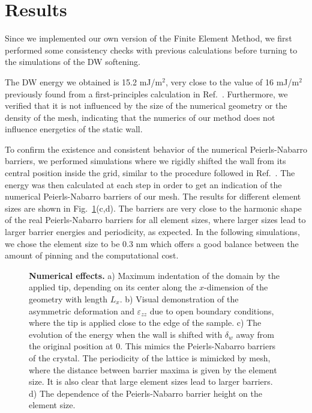 \section{Results}
Since we implemented our own version of the Finite Element Method, we first performed some consistency checks with previous calculations before turning to the simulations of the DW softening.

The DW energy we obtained is 15.2 mJ/m$^2$, very close to the value of 16 mJ/m$^2$ previously found from a first-principles calculation in Ref.~\cite{Padilla1996}.
Furthermore, we verified that it is not influenced by the size of the numerical geometry or the density of the mesh, indicating that the numerics of our method does not influence energetics of the static wall.

To confirm the existence and consistent behavior of the numerical Peierls-Nabarro barriers, we performed simulations where we rigidly shifted the wall from its central position inside the grid, similar to the procedure followed in Ref.~\cite{Marton2018}.
The energy was then calculated at each step in order to get an indication of the numerical Peierls-Nabarro barriers of our mesh.
The results for different element sizes are shown in Fig.~\ref{fig:BTO_numerical_effects}(c,d).
The barriers are very close to the harmonic shape of the real Peierls-Nabarro barriers for all element sizes, where larger sizes lead to larger barrier energies and periodicity, as expected.
In the following simulations, we chose the element size to be 0.3 nm which offers a good balance between the amount of pinning and the computational cost. 
\begin{figure}[h!]
	\caption{\label{fig:BTO_numerical_effects}{\bf Numerical effects.} a) Maximum indentation of the domain by the applied tip, depending on its center along the $x$-dimension of the geometry with length $L_x$. b) Visual demonstration of the asymmetric deformation and $\varepsilon_{zz}$ due to open boundary conditions, where the tip is applied close to the edge of the sample. c) The evolution of the energy when the wall is shifted with $\delta_w$ away from the original position at 0. This mimics the Peierls-Nabarro barriers of the crystal. The periodicity of the lattice is mimicked by mesh, where the distance between barrier maxima is given by the element size. It is also clear that large element sizes lead to larger barriers. d) The dependence of the Peierls-Nabarro barrier height on the element size.}
\end{figure}
